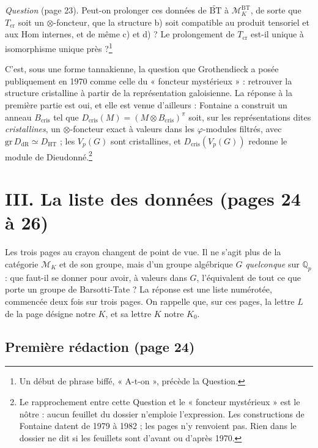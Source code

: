\documentclass[11pt,a4paper]{article}
\begin{document}
\emph{Question} (page 23). Peut-on prolonger ces données de
$\widetilde{\mathrm{BT}}$ à $\mathcal{M}^{\mathrm{BT}}_K$, de sorte que
$T_{\mathrm{cr}}$ soit un $\otimes$-foncteur, que la structure b) soit
compatible au produit tensoriel et aux $\mathrm{Hom}$ internes, et de même c)
et d) ? Le prolongement de $T_{\mathrm{cr}}$ est-il unique à isomorphisme
unique près ?\footnote{Un début de phrase biffé, « A-t-on », précède la
Question.}

C'est, sous une forme tannakienne, la question que Grothendieck a posée
publiquement en 1970 comme celle du « foncteur mystérieux » : retrouver la
structure cristalline à partir de la représentation galoisienne. La réponse à
la première partie est oui, et elle est venue d'ailleurs : Fontaine a
construit un anneau $B_{\mathrm{cris}}$ tel que $D_{\mathrm{cris}}(M) = (M
\otimes B_{\mathrm{cris}})^{\pi}$ soit, sur les représentations dites
\emph{cristallines}, un $\otimes$-foncteur exact à valeurs dans les
$\varphi$-modules filtrés, avec $\mathrm{gr}\, D_{\mathrm{dR}} \simeq
D_{\mathrm{HT}}$ ; les $V_p(G)$ sont cristallines, et
$D_{\mathrm{cris}}(V_p(G))$ redonne le module de Dieudonné.\footnote{Le
rapprochement entre cette Question et le « foncteur mystérieux » est le nôtre :
aucun feuillet du dossier n'emploie l'expression. Les constructions de
Fontaine datent de 1979 à 1982 ; les pages n'y renvoient pas. Rien dans le
dossier ne dit si les feuillets sont d'avant ou d'après 1970.}

\section*{III. La liste des données (pages 24 à 26)}

Les trois pages au crayon changent de point de vue. Il ne s'agit plus de la
catégorie $\mathcal{M}_K$ et de son groupe, mais d'un groupe algébrique $G$
\emph{quelconque} sur $\mathbb{Q}_p$ : que faut-il se donner pour avoir, à
valeurs dans $G$, l'équivalent de tout ce que porte un groupe de
Barsotti-Tate ? La réponse est une liste numérotée, commencée deux fois sur
trois pages. On rappelle que, sur ces pages, la lettre $L$ de la page désigne notre $K$, et
sa lettre $K$ notre $K_0$.

\subsection*{Première rédaction (page 24)}
\end{document}
